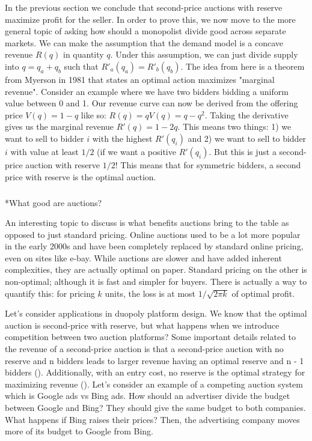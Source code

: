 \documentclass[
  letterpaper,
  numbers=noenddot,
  DIV=11]{scrreprt}
\makeatletter
\let\oldsubparagraph\subparagraph
\renewcommand{\subparagraph}{
    \@ifstar
      \xxxSubParagraphStar
      \xxxSubParagraphNoStar
  }
\newcommand{\xxxSubParagraphStar}[1]{\oldsubparagraph*{#1}\mbox{}}
\newcommand{\xxxSubParagraphNoStar}[1]{\oldsubparagraph{#1}\mbox{}}
\theoremstyle{definition}
\theoremstyle{plain}
\theoremstyle{plain}
\theoremstyle{remark}
\makeatother
\begin{document}
In the previous section we conclude that second-price auctions with
reserve maximize profit for the seller. In order to prove this, we now
move to the more general topic of asking how should a monopolist divide
good across separate markets. We can make the assumption that the demand
model is a concave revenue \(R(q)\) in quantity \(q\). Under this
assumption, we can just divide supply into \(q = q_a + q_b\) such that
\(R'_a(q_a) = R'_b(q_b)\). The idea from here is a theorem from Myerson
in 1981 that states an optimal action maximizes "marginal revenue".
Consider an example where we have two bidders bidding a uniform value
between 0 and 1. Our revenue curve can now be derived from the offering
price \(V(q) = 1 - q\) like so: \(R(q) = qV(q) = q - q^2\). Taking the
derivative gives us the marginal revenue \(R'(q) = 1-2q\). This means
two things: 1) we want to sell to bidder \(i\) with the highest
\(R'(q_i)\) and 2) we want to sell to bidder \(i\) with value at least
\(1/2\) (if we want a positive \(R'(q_i)\). But this is just a
second-price auction with reserve \(1/2\)! This means that for symmetric
bidders, a second price with reserve is the optimal auction.

\subparagraph*{What good are auctions?}\label{what-good-are-auctions}

An interesting topic to discuss is what benefits auctions bring to the
table as opposed to just standard pricing. Online auctions used to be a
lot more popular in the early 2000s and have been completely replaced by
standard online pricing, even on sites like e-bay. While auctions are
slower and have added inherent complexities, they are actually optimal
on paper. Standard pricing on the other is non-optimal; although it is
fast and simpler for buyers. There is actually a way to quantify this:
for pricing \(k\) units, the loss is at most \(1 / \sqrt{2\pi k}\) of
optimal profit.

Let's consider applications in duopoly platform design. We know that the
optimal auction is second-price with reserve, but what happens when we
introduce competition between two auction platforms? Some important
details related to the revenue of a second-price auction is that a
second-price auction with no reserve and n bidders leads to larger
revenue having an optimal reserve and n - 1 bidders
().
Additionally, with an entry cost, no reserve is the optimal strategy for
maximizing revenue ().
Let's consider an example of a competing auction system which is Google
ads vs Bing ads. How should an advertiser divide the budget between
Google and Bing? They should give the same budget to both companies.
What happens if Bing raises their prices? Then, the advertising company
moves more of its budget to Google from Bing.
\end{document}
